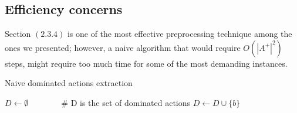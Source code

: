 \subsection{Efficiency concerns}
Section $(2.3.4)$ is one of the most effective preprocessing technique among the ones we presented; however, a naive algorithm that would require $O(|A^+|^2)$ steps, might require too much time for some of the most demanding instances.
\begin{algorithm}[h]
    \caption{Naive dominated actions extraction}
    \begin{algorithmic}
        \State $D\gets\emptyset\qquad\qquad$\# D is the set of dominated actions
                    \State $D\gets D\cup\{b\}$
                \EndIf
            \EndFor
        \EndFor
    \end{algorithmic}
\end{algorithm}

